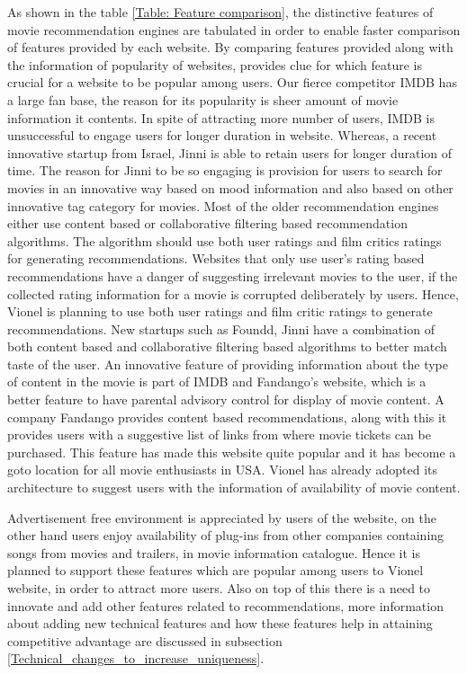    As shown in the table \ref{Table: Feature comparison}, the distinctive features of movie recommendation engines are tabulated in order to enable faster comparison of features provided by each website. By comparing features provided along with the information of popularity of websites, provides clue for which feature is crucial for a website to be popular among users. Our fierce competitor \acrshort{IMDB} has a large fan base, the reason for its popularity is sheer amount of movie information it contents. In spite of attracting more number of users, \acrshort{IMDB} is unsuccessful to engage users for longer duration in website. Whereas, a recent innovative startup from Israel, Jinni is able to retain users for longer duration of time. The reason for Jinni to be so engaging is provision for users to search for movies in an innovative way based on mood information and also based on other innovative tag category for movies. Most of the older recommendation engines either use content based or collaborative filtering based recommendation algorithms. The algorithm should use both user ratings and film critics ratings for generating recommendations. Websites that only use user's rating based recommendations have a danger of suggesting irrelevant movies to the user, if the collected rating information for a movie is corrupted deliberately by users. Hence, Vionel is planning to use both user ratings and film critic ratings to generate recommendations. New startups such as Foundd, Jinni have a combination of both content based and collaborative filtering based algorithms to better match taste of the user. An innovative feature of providing information about the type of content in the movie is part of \acrshort{IMDB} and Fandango's website, which is a better feature to have parental advisory control for display of movie content. A company Fandango provides content based recommendations, along with this it provides users with a suggestive list of links from where movie tickets can be purchased. This feature has made this website quite popular and it has become a goto location for all movie enthusiasts in USA. Vionel has already adopted its architecture to suggest users with the information of availability of movie content.  

   Advertisement free environment is appreciated by users of the website, on the other hand users enjoy availability of plug-ins from other companies containing songs from movies and trailers, in movie information catalogue. Hence it is planned to support these features which are popular among users to Vionel website, in order to attract more users. Also on top of this there is a need to innovate and add other features related to recommendations, more information about adding new technical features and how these features help in attaining competitive advantage are discussed in subsection \ref{Technical_changes_to_increase_uniqueness}.  

